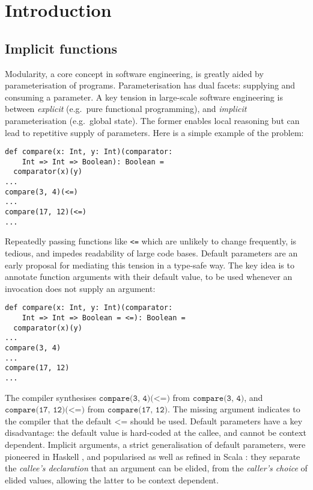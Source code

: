 \section{Introduction}

\subsection{Implicit functions}
Modularity, a core concept in software engineering, is greatly aided by
parameterisation of programs. Parameterisation has dual facets: supplying and
consuming a parameter.  A key tension in large-scale software engineering is
between \emph{explicit} (e.g.~pure functional programming), and \emph{implicit}
parameterisation (e.g.~global state).  The former enables local reasoning but
can lead to repetitive supply of parameters.  Here is a simple example of the
problem:

\begin{minipage}{\linewidth}
\begin{lstlisting}[mathescape]
def compare(x: Int, y: Int)(comparator:
    Int => Int => Boolean): Boolean =
  comparator(x)(y)
...
compare(3, 4)(<=)
...
compare(17, 12)(<=)
...
\end{lstlisting}
\end{minipage}

\noindent Repeatedly passing functions like \texttt{<=} which are unlikely to
change frequently, is tedious, and impedes readability of large code bases.
Default parameters  are an early proposal for mediating this tension in a
type-safe way. The key idea is to annotate function arguments with their
default value, to be used whenever an invocation does not supply an argument:

\begin{minipage}{\linewidth}
\begin{lstlisting}[mathescape]
def compare(x: Int, y: Int)(comparator:
    Int => Int => Boolean = <=): Boolean =
  comparator(x)(y)
...
compare(3, 4)
...
compare(17, 12)
...
\end{lstlisting}
\end{minipage}

\noindent The compiler synthesises $\texttt{compare(3, 4)(<=)}$ from
$\texttt{compare(3, 4)}$, and $\texttt{compare(17, 12)(<=)}$ from
$\texttt{compare(17, 12)}$. The missing argument indicates to the compiler that
the default $\texttt{<=}$ should be used. Default parameters have a key
disadvantage: the default value is hard-coded at the callee, and cannot be
context dependent. Implicit arguments, a strict generalisation of default
parameters, were pioneered in Haskell \cite{LLMS00}, and popularised as well as
refined  in Scala \cite{OBLB18}: they separate the \emph{callee's declaration}
that an argument can be elided, from the \emph{caller's choice} of elided
values, allowing the latter to be context dependent.

